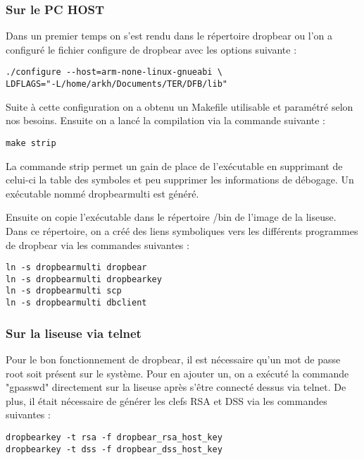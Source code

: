 \subsubsection{Sur le PC HOST}

Dans un premier temps on s'est rendu dans le répertoire dropbear ou l'on a configuré le fichier configure de dropbear avec les options suivante :

\begin{lstlisting}
./configure --host=arm-none-linux-gnueabi \
LDFLAGS="-L/home/arkh/Documents/TER/DFB/lib"
\end{lstlisting} 

Suite à cette configuration on a obtenu un Makefile utilisable et paramétré selon nos besoins.
Ensuite on a lancé la compilation via la commande suivante :

\begin{lstlisting}
make strip
\end{lstlisting}

La commande strip permet un gain de place de l'exécutable en supprimant de celui-ci la table des symboles et peu supprimer les informations de débogage. Un exécutable nommé dropbearmulti est généré.

Ensuite on copie l'exécutable dans le répertoire /bin de l'image de la liseuse. Dans ce répertoire, on a créé des liens symboliques vers les différents programmes de dropbear via les commandes suivantes :

\begin{lstlisting}
ln -s dropbearmulti dropbear
ln -s dropbearmulti dropbearkey
ln -s dropbearmulti scp
ln -s dropbearmulti dbclient
\end{lstlisting}  

\subsubsection{Sur la liseuse via telnet}

Pour le bon fonctionnement de dropbear, il est nécessaire qu'un mot de passe root soit présent sur le système. Pour en ajouter un, on a exécuté la commande "gpasswd" directement sur la liseuse après s'être connecté dessus via telnet.
De plus, il était nécessaire de générer les clefs RSA et DSS via les commandes suivantes :

\begin{lstlisting}
dropbearkey -t rsa -f dropbear_rsa_host_key
dropbearkey -t dss -f dropbear_dss_host_key
\end{lstlisting}


